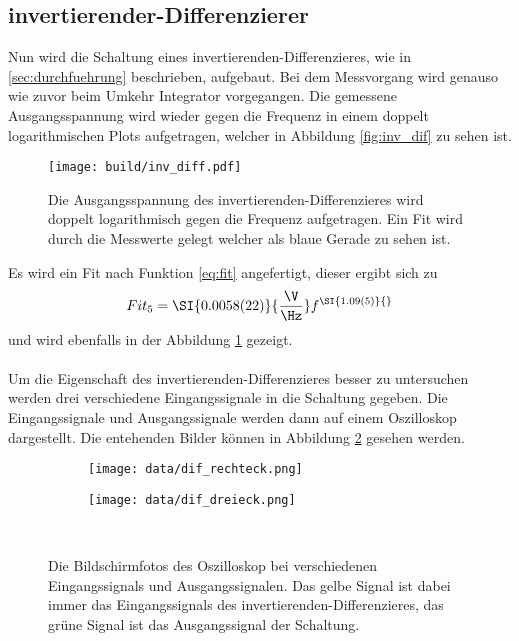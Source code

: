 \subsection{invertierender-Differenzierer}
Nun wird die Schaltung eines invertierenden-Differenzieres, wie in \ref{sec:durchfuehrung} beschrieben, aufgebaut.
Bei dem Messvorgang wird genauso wie zuvor beim Umkehr Integrator vorgegangen.
Die gemessene Ausgangsspannung wird wieder gegen die Frequenz in einem doppelt logarithmischen Plots aufgetragen, welcher in Abbildung \ref{fig:inv_dif} zu sehen ist.
\begin{figure}
    \centering
    \texttt{[image: build/inv\_diff.pdf]}
    \caption{Die Ausgangsspannung des invertierenden-Differenzieres wird doppelt logarithmisch gegen die Frequenz aufgetragen.
    Ein Fit wird durch die Messwerte gelegt welcher als blaue Gerade zu sehen ist.}
    \label{fig:inv_diff}
\end{figure}
Es wird ein Fit nach Funktion \eqref{eq:fit} angefertigt, dieser ergibt sich zu 
\begin{equation*}
    Fit_5 = \SI{0.0058(22)}{\frac{\V}{\Hz}} f^{\SI{1.09(5)}{}}
\end{equation*}
und wird ebenfalls in der Abbildung \ref{fig:inv_diff} gezeigt.\\\\
Um die Eigenschaft des invertierenden-Differenzieres besser zu untersuchen werden drei verschiedene Eingangssignale in die Schaltung gegeben.
Die Eingangssignale und Ausgangssignale werden dann auf einem Oszilloskop dargestellt.
Die entehenden Bilder können in Abbildung \ref{fig:dif_oszi} gesehen werden.
\begin{figure}
    \centering
    \begin{subfigure}{0.49\linewidth}%
        \texttt{[image: data/dif\_rechteck.png]}
    \end{subfigure}
    \hfill
    \begin{subfigure}{0.49\linewidth}%
        \texttt{[image: data/dif\_dreieck.png]}
    \end{subfigure}\\
    \caption{Die Bildschirmfotos des Oszilloskop bei verschiedenen Eingangssignals und Ausgangssignalen.
    Das gelbe Signal ist dabei immer das Eingangssignals des invertierenden-Differenzieres, das grüne Signal ist das Ausgangssignal der Schaltung.}
    \label{fig:dif_oszi}
\end{figure}

